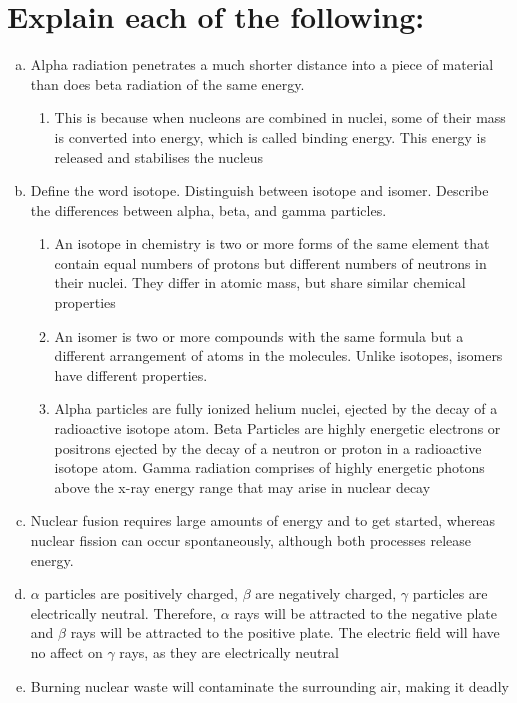 \documentclass[11pt]{article}
\begin{document}
\section{Explain each of the following:}
\label{sec:org33fd5ad}
\begin{enumerate}[(a)]
\item Alpha radiation penetrates a much shorter distance into a piece of material than does beta radiation of the same energy.
\begin{enumerate}
\item This is because when nucleons are combined in nuclei, some of their mass is converted into energy, which is called binding energy. This energy is released and stabilises the nucleus
\end{enumerate}

\item Define the word isotope. Distinguish between isotope and isomer. Describe the differences between alpha, beta, and gamma particles.
\begin{enumerate}
\item An isotope in chemistry is two or more forms of the same element that contain equal numbers of protons but different numbers of neutrons in their nuclei. They differ in atomic mass, but share similar chemical properties
\item An isomer is two or more compounds with the same formula but a different arrangement of atoms in the molecules. Unlike isotopes, isomers have different properties.
\item Alpha particles are fully ionized helium nuclei, ejected by the decay
of a radioactive isotope atom. Beta Particles are highly energetic
electrons or positrons ejected by the decay of a neutron or proton in a radioactive isotope atom. Gamma radiation comprises of highly energetic photons above the x-ray energy range that may arise in nuclear decay
\end{enumerate}

\item Nuclear fusion requires large amounts of energy and to get started, whereas nuclear fission can occur spontaneously, although both processes release energy.

\item \(\alpha\) particles are positively charged, \(\beta\) are negatively charged, \(\gamma\) particles
are electrically neutral. Therefore, \(\alpha\) rays will be attracted to the
negative plate and \(\beta\) rays will be attracted to the positive plate. The electric field will have no affect on \(\gamma\) rays, as they are electrically neutral

\item Burning nuclear waste will contaminate the surrounding air, making it
deadly
\end{enumerate}
\end{document}
